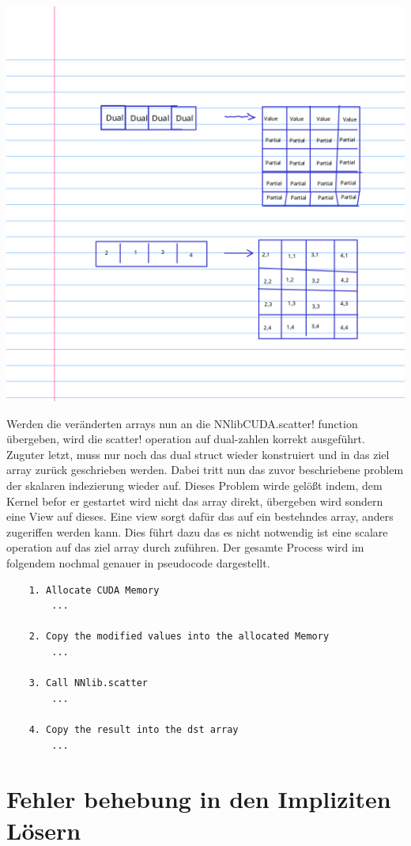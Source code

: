 \includegraphics{cropted.png}

Werden die veränderten arrays nun an die NNlibCUDA.scatter! function übergeben,
wird die scatter! operation auf dual-zahlen korrekt ausgeführt.
Zuguter letzt, muss nur noch das dual struct wieder konstruiert und in das ziel array zurück geschrieben werden. 
Dabei tritt nun das zuvor beschriebene problem der skalaren indezierung wieder auf.
Dieses Problem wirde gelößt indem, dem Kernel befor er gestartet wird nicht das array direkt, übergeben wird
sondern eine View auf dieses.
Eine view sorgt dafür das auf ein bestehndes array, anders zugeriffen werden kann.
Dies führt dazu das es nicht notwendig ist eine scalare operation auf das ziel array durch zuführen.
Der gesamte Process wird im folgendem nochmal genauer in pseudocode dargestellt.

\begin{verbatim}
	1. Allocate CUDA Memory 
		...		
		
	2. Copy the modified values into the allocated Memory
		...
		
	3. Call NNlib.scatter
		...
		
	4. Copy the result into the dst array
		...
\end{verbatim}


\section{ Fehler behebung in den Impliziten Lösern }

